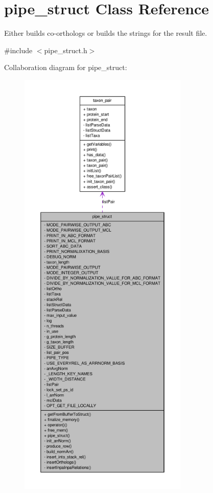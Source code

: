 \hypertarget{classpipe__struct}{
\section{pipe\_\-struct Class Reference}
\label{classpipe__struct}
}


Either builds co-\/orthologs or builds the strings for the result file.  




{\ttfamily \#include $<$pipe\_\-struct.h$>$}



Collaboration diagram for pipe\_\-struct:\nopagebreak
\begin{figure}[H]
\begin{center}
\leavevmode
\includegraphics[height=600pt]{classpipe__struct__coll__graph}
\end{center}
\end{figure}
